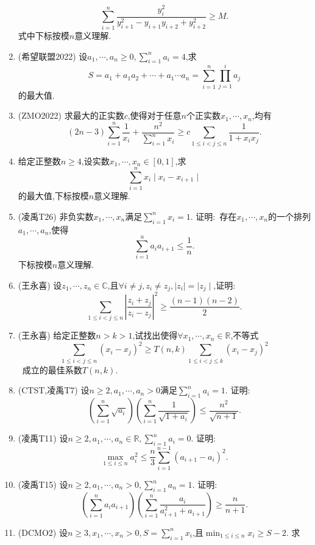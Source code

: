 \documentclass{article}
\begin{document}
\begin{enumerate}
            $$\sum_{i=1}^n{\frac{y_i^2}{y_{i+1}^2-y_{i+1}y_{i+2}+y_{i+2}^2}}\geq M.$$
            式中下标按模$n$意义理解.
        \item (希望联盟2022) 设$a_1,\cdots,a_n\ge0,\sum_{i=1}^n{a_i}=4$,求\ 
            $$S=a_1+a_1a_2+\cdots+a_1\cdots a_n=\sum_{i=1}^n{\prod_{j=1}^i{a_j}}$$的最大值.
        \item (ZMO2022) 求最大的正实数$c$,使得对于任意$n$个正实数$x_1,\cdots,x_n$,均有\
            $$(2n-3)\sum_{i=1}^n{\frac{1}{x_i}}+\frac{n^2}{\sum_{i=1}^n{x_i}}\geq c\sum_{1\le i<j \le n}{\frac{1}{1+x_ix_j}}.$$
        \item 给定正整数$n\ge4$,设实数$x_1,\cdots,x_n\in[0,1]$,求\ 
            $$\sum_{i=1}^n{x_i\mid x_i - x_{i+1} \mid}$$的最大值,下标按模$n$意义理解.
        \item (凌禹T26) 非负实数$x_1,\cdots,x_n$满足$\sum_{i=1}^n{x_i}=1$. 证明:\ 
            存在$x_1,\cdots,x_n$的一个排列$a_1,\cdots,a_n$,使得$$\sum_{i=1}^n{a_ia_{i+1}}\leq\frac{1}{n}.$$下标按模$n$意义理解.
        \item (王永喜) 设$z_1,\cdots,z_n\in\mathbb{C}$,且$\forall i \neq j, z_i\neq z_j, \mid z_i \mid = \mid z_j \mid$,证明: \ 
            $$\sum_{1\le i<j \le n} {{\left| \frac{z_i+z_j}{z_i-z_j} \right|}^2}\geq\frac{(n-1)(n-2)}{2}.$$
        \item (王永喜) 给定正整数$n>k>1$,试找出使得$\forall x_1,\cdots,x_n\in\mathbb{R}$,不等式\ 
            $$\sum_{1\le i<j \le n}{{\left( x_i-x_j \right)}^2}\geq T(n,k)\sum_{1 \le i<j \le k}{{\left( x_i-x_j \right)}^2}$$ \ 
            成立的最佳系数$T(n,k)$.
        \item (CTST,凌禹T7) 设$n\geq2,a_1,\cdots,a_n>0$满足$\sum_{i=1}^n{a_i}=1$. 证明: \ 
            $${\left( \sum_{i=1}^n{\sqrt{a_i}} \right)}{\left( \sum_{i=1}^n{\frac{1}{\sqrt{1+a_i}}} \right)}\leq\frac{n^2}{\sqrt{n+1}}.$$
        \item (凌禹T11) 设$n\geq2,a_1,\cdots,a_n\in\mathbb{R},\sum_{i=1}^n{a_i}=0$. 证明: \ 
            $$\max_{1\le i \le n}{a_i^2}\leq\frac{n}{3}\sum_{i=1}^{n-1}{(a_{i+1}-a_i)^2}.$$
        \item (凌禹T15) 设$n\geq2,a_1,\cdots,a_n>0,\sum_{i=1}^n{a_n}=1$. 证明: \ 
            $${\left( \sum_{i=1}^n{a_ia_{i+1}} \right)}{\left( \sum_{i=1}^n{\frac{a_i}{a_{i+1}^2+a_{i+1}}}\right)}\geq\frac{n}{n+1}.$$
        \item (DCMO2) 设$n\geq3,x_1,\cdots,x_n>0,S=\sum_{i=1}^n{x_i}$,且$\min_{1\le i \le n}{x_i}\geq S-2$. 求\ 

\end{enumerate}
\end{document}
